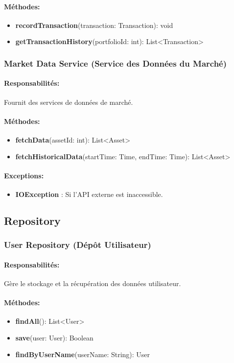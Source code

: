 \documentclass{article}
\begin{document}
\paragraph{Méthodes:}
\begin{itemize}
  \item \textbf{recordTransaction}(transaction: Transaction): void
  \item \textbf{getTransactionHistory}(portfolioId: int): List<Transaction>
\end{itemize}
\subsubsection{Market Data Service (Service des Données du Marché)}
\paragraph{Responsabilités:} Fournit des services de données de marché.
\paragraph{Méthodes:}
\begin{itemize}
  \item \textbf{fetchData}(assetId: int): List<Asset>
  \item \textbf{fetchHistoricalData}(startTime: Time, endTime: Time): List<Asset>
\end{itemize}
\paragraph{Exceptions:}
\begin{itemize}
  \item \textbf{IOException} : Si l'API externe est inaccessible.
\end{itemize}
\subsection{Repository}
\subsubsection{User Repository (Dépôt Utilisateur)}
\paragraph{Responsabilités:} Gère le stockage et la récupération des données utilisateur.
\paragraph{Méthodes:}
\begin{itemize}
  \item \textbf{findAll}(): List<User>
  \item \textbf{save}(user: User): Boolean
  \item \textbf{findByUserName}(userName: String): User
\end{itemize}
\end{document}
